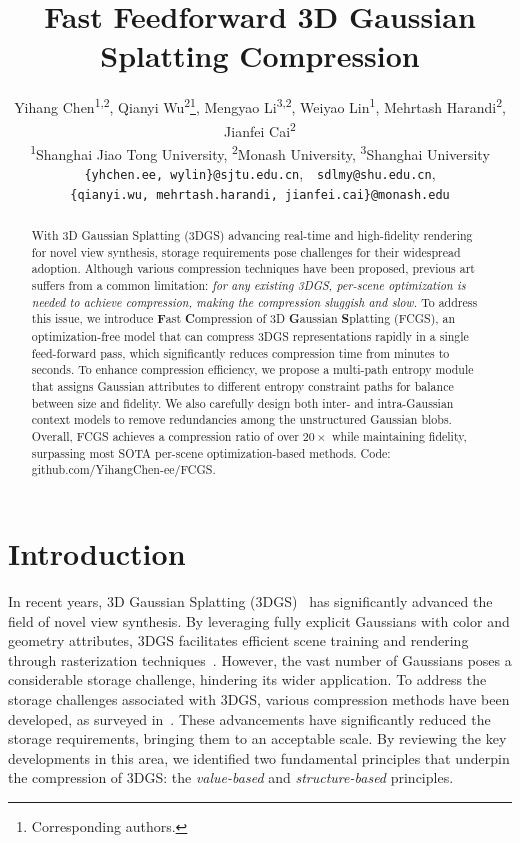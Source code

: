 \documentclass{article} %
\title{Fast Feedforward 3D Gaussian Splatting Compression}
\author{
  Yihang Chen\textsuperscript{1,2},  
  Qianyi Wu\textsuperscript{2}\thanks{Corresponding authors.},
  Mengyao Li\textsuperscript{3,2},
  Weiyao Lin\textsuperscript{1}\footnotemark[1],
  Mehrtash Harandi\textsuperscript{2},
  Jianfei Cai\textsuperscript{2} \\
  \textsuperscript{1}Shanghai Jiao Tong University,
  \textsuperscript{2}Monash University,
  \textsuperscript{3}Shanghai University\\
  \texttt{\{yhchen.ee, wylin\}@sjtu.edu.cn},~~\texttt{sdlmy@shu.edu.cn}, \\ 
  \texttt{\{qianyi.wu, mehrtash.harandi, jianfei.cai\}@monash.edu}\\ 
}
\begin{document}
\maketitle
\begin{abstract} 
With 3D Gaussian Splatting (3DGS) advancing real-time and high-fidelity rendering for novel view synthesis, storage requirements pose challenges for their widespread adoption. Although various compression techniques have been proposed, previous art suffers from a common limitation: \textit{for any existing 3DGS, per-scene optimization is needed to achieve compression, making the compression sluggish and slow.} To address this issue, we introduce \textbf{F}ast \textbf{C}ompression of 3D \textbf{G}aussian \textbf{S}platting (FCGS), an optimization-free model that can compress 3DGS representations rapidly in a single feed-forward pass, which significantly reduces compression time from minutes to seconds.
To enhance compression efficiency, we propose a multi-path entropy module that assigns Gaussian attributes to different entropy constraint paths for balance between size and fidelity. We also carefully design both inter- and intra-Gaussian context models to remove redundancies among the unstructured Gaussian blobs.
Overall, FCGS achieves a compression ratio of over $20\times$ while maintaining fidelity, surpassing most SOTA per-scene optimization-based methods. 
Code: github.com/YihangChen-ee/FCGS.


\end{abstract}
\section{Introduction}
In recent years, 3D Gaussian Splatting (3DGS)~\citep{3DGS} has significantly advanced the field of novel view synthesis. By leveraging fully explicit Gaussians with color and geometry attributes, 3DGS facilitates efficient scene training and rendering through rasterization techniques~\citep{ewa}. However, the vast number of Gaussians poses a considerable storage challenge, hindering its wider application.
To address the storage challenges associated with 3DGS, various compression methods have been developed, as surveyed in~\citep{3dgszip}. These advancements have significantly reduced the storage requirements, bringing them to an acceptable scale. By reviewing the key developments in this area, we identified two fundamental principles that underpin the compression of 3DGS: the \textit{value-based} and \textit{structure-based} principles.
\end{document}
